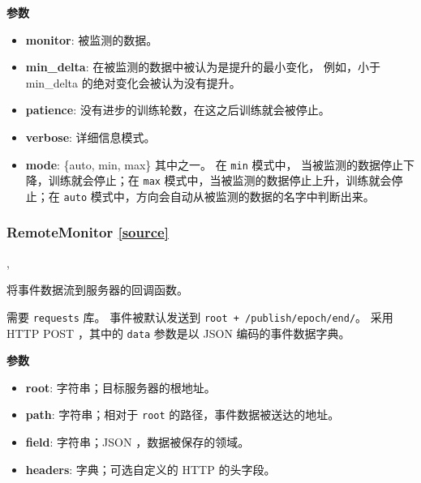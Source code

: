 \textbf{参数}

\begin{itemize}
\tightlist
\item
  \textbf{monitor}: 被监测的数据。
\item
  \textbf{min\_delta}: 在被监测的数据中被认为是提升的最小变化，
  例如，小于 min\_delta 的绝对变化会被认为没有提升。
\item
  \textbf{patience}: 没有进步的训练轮数，在这之后训练就会被停止。
\item
  \textbf{verbose}: 详细信息模式。
\item
  \textbf{mode}: \{auto, min, max\} 其中之一。 在 \texttt{min} 模式中，
  当被监测的数据停止下降，训练就会停止；在 \texttt{max}
  模式中，当被监测的数据停止上升，训练就会停止；在 \texttt{auto}
  模式中，方向会自动从被监测的数据的名字中判断出来。
\end{itemize}




\subsubsection{RemoteMonitor {\href{https://github.com/keras-team/keras/blob/master/keras/callbacks.py\#L514}{{[}source{]}}}}

\begin{Shaded}
\begin{Highlighting}[]
\OperatorTok{=}, \\
\hspace{3cm}\OperatorTok{=}\OperatorTok{=}\OperatorTok{=}\NormalTok{)}
\end{Highlighting}
\end{Shaded}

将事件数据流到服务器的回调函数。

需要 \texttt{requests} 库。 事件被默认发送到
\texttt{root\ +\ \textquotesingle{}/publish/epoch/end/\textquotesingle{}}。
采用 HTTP POST ，其中的 \texttt{data} 参数是以 JSON 编码的事件数据字典。

\textbf{参数}

\begin{itemize}
\tightlist
\item
  \textbf{root}: 字符串；目标服务器的根地址。
\item
  \textbf{path}: 字符串；相对于 \texttt{root}
  的路径，事件数据被送达的地址。
\item
  \textbf{field}: 字符串；JSON ，数据被保存的领域。
\item
  \textbf{headers}: 字典；可选自定义的 HTTP 的头字段。
\end{itemize}



